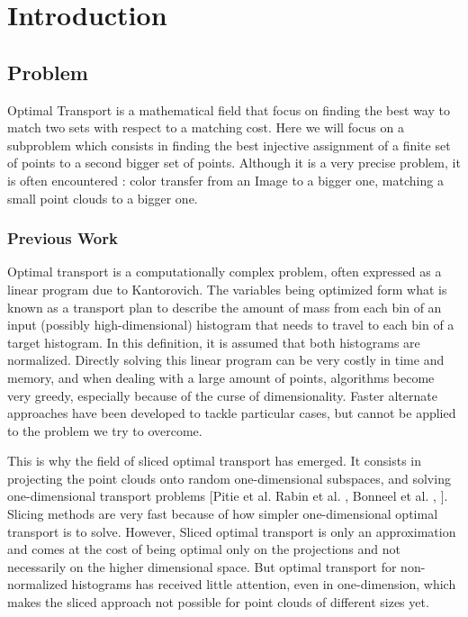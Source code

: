 \documentclass[a4paper,12pt]{article}
\begin{document}

\bigskip

\section*{Introduction}

\subsection*{Problem}

Optimal Transport is a mathematical field that focus on finding the best way to match two sets with respect to a matching cost. Here we will focus on a subproblem which consists in finding the best injective assignment of a finite set of points to a second bigger set of points. Although it is a very precise problem, it is often encountered : color transfer from an Image to a bigger one, matching a small point clouds to a bigger one. 

\subsubsection*{Previous Work}

Optimal transport is a computationally complex problem, often expressed as a linear program due to Kantorovich. The variables being optimized form what is known as a transport plan to describe the amount of mass from each bin of an input (possibly high-dimensional) histogram that needs to travel to each bin of a target histogram. In this definition, it is assumed that both histograms are normalized. Directly solving this linear program can be very costly in time and memory, and when dealing with a large amount of points, algorithms become very greedy, especially because of the curse of dimensionality. Faster alternate approaches have been developed to tackle particular cases, but cannot be applied to the problem we try to overcome.

This is why the field of sliced optimal transport has emerged. It consists in projecting the point clouds onto random one-dimensional subspaces, and solving one-dimensional transport problems [Pitie et al. Rabin et al. \cite{pitie2005n}, Bonneel et al. \cite{rabin2011wasserstein}, \cite{bonneel2015sliced}]. Slicing methods are very fast because of how simpler one-dimensional optimal transport is to solve. However, Sliced optimal transport is only an approximation and comes at the cost of being optimal only on the projections and not necessarily on the higher dimensional space.
  But optimal transport for non-normalized histograms has received little attention, even in one-dimension, which makes the sliced approach not possible for point clouds of different sizes yet.
 
\end{document}
